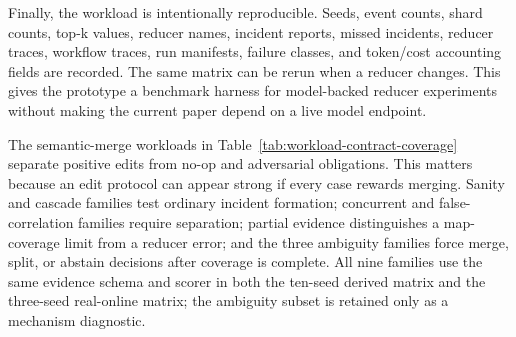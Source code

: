 \documentclass[sigplan,anonymous,nonacm]{acmart}
\begin{document}
Finally, the workload is intentionally reproducible. Seeds, event counts, shard counts, top-k values, reducer names, incident reports, missed incidents, reducer traces, workflow traces, run manifests, failure classes, and token/cost accounting fields are recorded. The same matrix can be rerun when a reducer changes. This gives the prototype a benchmark harness for model-backed reducer experiments without making the current paper depend on a live model endpoint.

The semantic-merge workloads in Table~\ref{tab:workload-contract-coverage} separate positive edits from no-op and adversarial obligations. This matters because an edit protocol can appear strong if every case rewards merging. Sanity and cascade families test ordinary incident formation; concurrent and false-correlation families require separation; partial evidence distinguishes a map-coverage limit from a reducer error; and the three ambiguity families force merge, split, or abstain decisions after coverage is complete. All nine families use the same evidence schema and scorer in both the ten-seed derived matrix and the three-seed real-online matrix; the ambiguity subset is retained only as a mechanism diagnostic.
\end{document}
